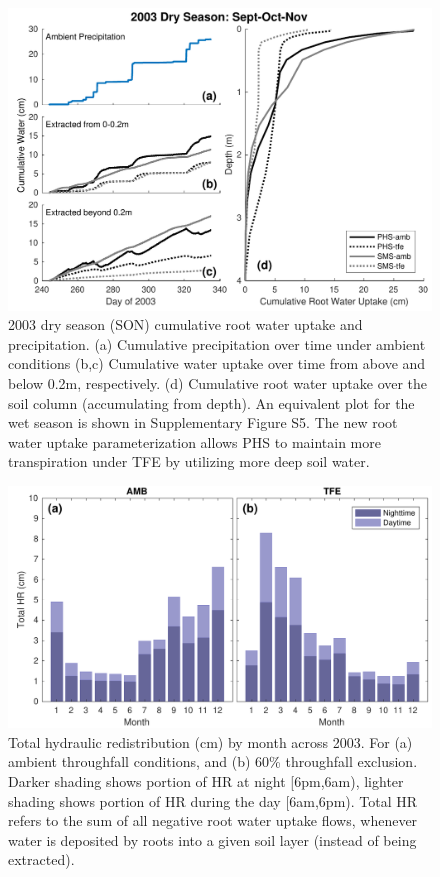 \documentclass[draft,linenumbers]{agujournal}
\begin{document}
        \clearpage
    \begin{figure}[h]
     \centering
     \includegraphics[width=30pc]{qdry.pdf}
     \caption{2003 dry season (SON) cumulative root water uptake and precipitation. 
     (a) Cumulative precipitation over time under ambient conditions
     (b,c) Cumulative water uptake over time from above and below 0.2m, respectively.
     (d) Cumulative root water uptake over the soil column (accumulating from depth).
     An equivalent plot for the wet season is shown in Supplementary Figure S5.
The new root water uptake parameterization allows PHS to maintain more transpiration under TFE by utilizing more deep soil water.}
     \label{fig:qdry}
  \end{figure}
               
    \clearpage
    \begin{figure}[h]
     \centering
     \includegraphics[width=30pc]{hr.pdf}
     \caption{Total hydraulic redistribution (cm) by month across 2003. For (a) ambient throughfall conditions, and (b) 60\% throughfall exclusion. 
     Darker shading shows portion of HR at night [6pm,6am), lighter shading shows portion of HR during the day [6am,6pm).
     Total HR refers to the sum of all negative root water uptake flows, whenever water is deposited by roots into a given soil layer (instead of being extracted).}
     \label{fig:hr}
  \end{figure}
\end{document}
